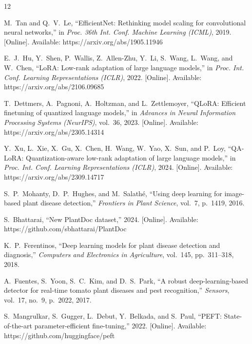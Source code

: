 \documentclass[conference]{IEEEtran}
\begin{document}
\balance

\begin{thebibliography}{12}

M.~Tan and Q.~V.~Le,
``EfficientNet: Rethinking model scaling for convolutional neural networks,''
in \emph{Proc. 36th Int. Conf. Machine Learning (ICML)}, 2019.
[Online]. Available: https://arxiv.org/abs/1905.11946

E.~J.~Hu, Y.~Shen, P.~Wallis, Z.~Allen-Zhu, Y.~Li, S.~Wang, L.~Wang, and W.~Chen,
``LoRA: Low-rank adaptation of large language models,''
in \emph{Proc. Int. Conf. Learning Representations (ICLR)}, 2022.
[Online]. Available: https://arxiv.org/abs/2106.09685

T.~Dettmers, A.~Pagnoni, A.~Holtzman, and L.~Zettlemoyer,
``QLoRA: Efficient finetuning of quantized language models,''
in \emph{Advances in Neural Information Processing Systems (NeurIPS)}, vol.~36, 2023.
[Online]. Available: https://arxiv.org/abs/2305.14314

Y.~Xu, L.~Xie, X.~Gu, X.~Chen, H.~Wang, W.~Yao, X.~Sun, and P.~Loy,
``QA-LoRA: Quantization-aware low-rank adaptation of large language models,''
in \emph{Proc. Int. Conf. Learning Representations (ICLR)}, 2024.
[Online]. Available: https://arxiv.org/abs/2309.14717

S.~P.~Mohanty, D.~P.~Hughes, and M.~Salath\'{e},
``Using deep learning for image-based plant disease detection,''
\textit{Frontiers in Plant Science}, vol.~7, p.~1419, 2016.

S.~Bhattarai,
``New PlantDoc dataset,''
2024.
[Online]. Available: https://github.com/sbhattarai/PlantDoc

K.~P.~Ferentinos,
``Deep learning models for plant disease detection and diagnosis,''
\textit{Computers and Electronics in Agriculture}, vol.~145, pp.~311--318, 2018.

A.~Fuentes, S.~Yoon, S.~C.~Kim, and D.~S.~Park,
``A robust deep-learning-based detector for real-time tomato plant diseases and pest recognition,''
\textit{Sensors}, vol.~17, no.~9, p.~2022, 2017.

S.~Mangrulkar, S.~Gugger, L.~Debut, Y.~Belkada, and S.~Paul,
``PEFT: State-of-the-art parameter-efficient fine-tuning,''
2022.
[Online]. Available: https://github.com/huggingface/peft


\end{thebibliography}
\end{document}
